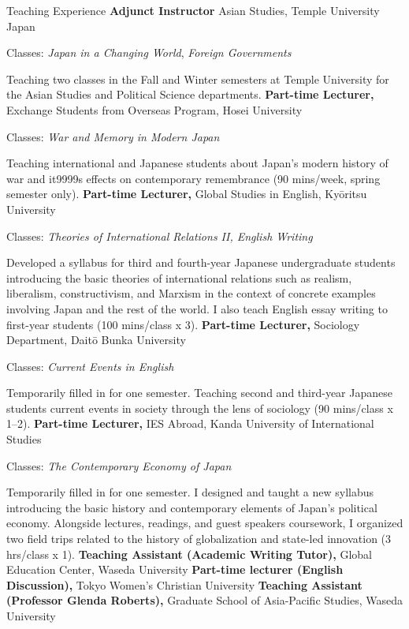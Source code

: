 \begin{rubric}{Teaching Experience}
\textbf{Adjunct Instructor} Asian Studies, Temple University Japan
\par Classes: \emph{Japan in a Changing World}, \emph{Foreign Governments}
      \par \small Teaching two classes in the Fall and Winter semesters at Temple University for the Asian Studies and Political Science departments.
%
%
%
\textbf{Part-time Lecturer,} Exchange Students from Overseas Program, Hosei University
        \par Classes: \emph{War and Memory in Modern Japan}
        \par \small Teaching international and Japanese students about Japan's modern history of war and it9999s effects on contemporary remembrance (90 mins/week, spring semester only).
	\textbf{Part-time Lecturer,} Global Studies in English, Kyōritsu University
        \par Classes: \emph{Theories of International Relations II, English Writing}
        \par \small Developed a syllabus for third and fourth-year Japanese undergraduate students introducing the basic theories of international relations such as realism, liberalism, constructivism, and Marxism in the context of concrete examples involving Japan and the rest of the world. I also teach English essay writing to first-year students (100 mins/class x 3).
  \entry*[2024/09 -- 2025/03\hfill]%
	\textbf{Part-time Lecturer,} Sociology Department, Daitō Bunka University
        \par Classes: \emph{Current Events in English}
        \par \small Temporarily filled in for one semester. Teaching second and third-year Japanese students current events in society through the lens of sociology (90 mins/class x 1--2).
 \entry*[2024/09 -- 2024/12\hfill]%
	\textbf{Part-time Lecturer,} IES Abroad, Kanda University of International Studies
        \par Classes: \emph{The Contemporary Economy of Japan}
        \par \small Temporarily filled in for one semester. I designed and taught a new syllabus introducing the basic history and contemporary elements of Japan's political economy. Alongside lectures, readings, and guest speakers coursework, I organized two field trips related to the history of globalization and state-led innovation (3 hrs/class x 1).
\entry*[2019/09 -- 2025/02\hfill]%
	\textbf{Teaching Assistant (Academic Writing Tutor),} Global Education Center, Waseda University
%
%
%
 \entry*[2023/09 -- 2024/03\hfill]%
	\textbf{Part-time lecturer (English Discussion),} Tokyo Women's Christian University
\entry*[2023/04 -- 2024/03\hfill]%
	\textbf{Teaching Assistant (Professor Glenda Roberts),} Graduate School of Asia-Pacific Studies, Waseda University
\end{rubric}
